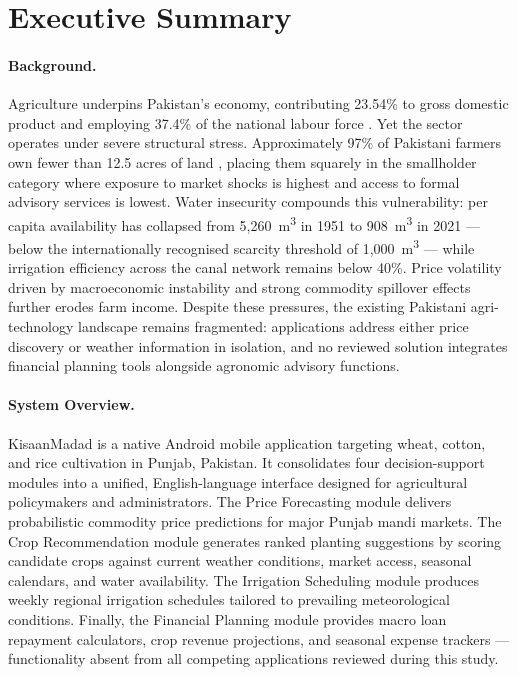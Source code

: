 \documentclass{FastFyp}
\begin{document}
\section*{Executive Summary}

\paragraph{Background.}
Agriculture underpins Pakistan's economy, contributing 23.54\% to gross domestic product and employing 37.4\% of the national labour force \cite{pakistan_economic_survey_2025}. Yet the sector operates under severe structural stress. Approximately 97\% of Pakistani farmers own fewer than 12.5 acres of land \cite{rana2025farmers}, placing them squarely in the smallholder category where exposure to market shocks is highest and access to formal advisory services is lowest. Water insecurity compounds this vulnerability: per capita availability has collapsed from 5,260~m\textsuperscript{3} in 1951 to 908~m\textsuperscript{3} in 2021 --- below the internationally recognised scarcity threshold of 1,000~m\textsuperscript{3} \cite{pcrwr2021water} --- while irrigation efficiency across the canal network remains below 40\%. Price volatility driven by macroeconomic instability and strong commodity spillover effects further erodes farm income. Despite these pressures, the existing Pakistani agri-technology landscape remains fragmented: applications address either price discovery or weather information in isolation, and no reviewed solution integrates financial planning tools alongside agronomic advisory functions.

\paragraph{System Overview.}
KisaanMadad is a native Android mobile application targeting wheat, cotton, and rice cultivation in Punjab, Pakistan. It consolidates four decision-support modules into a unified, English-language interface designed for agricultural policymakers and administrators. The Price Forecasting module delivers probabilistic commodity price predictions for major Punjab mandi markets. The Crop Recommendation module generates ranked planting suggestions by scoring candidate crops against current weather conditions, market access, seasonal calendars, and water availability. The Irrigation Scheduling module produces weekly regional irrigation schedules tailored to prevailing meteorological conditions. Finally, the Financial Planning module provides macro loan repayment calculators, crop revenue projections, and seasonal expense trackers --- functionality absent from all competing applications reviewed during this study.
\end{document}
